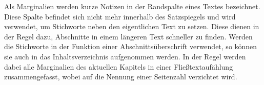 \documentclass[draft]{article}
\begin{document}
  Als Marginalien werden kurze Notizen in der
  Randspalte eines Textes bezeichnet. Diese Spalte
  befindet sich nicht mehr innerhalb
  des Satzspiegels und wird verwendet, um
  Stichworte neben den eigentlichen Text zu setzen.
  Diese dienen in der Regel dazu, Abschnitte in einem
  längeren Text schneller zu finden. Werden die Stichworte
  in der Funktion einer Abschnittsüberschrift verwendet, so können
  sie auch in das Inhaltsverzeichnis aufgenommen werden.
  In der Regel werden dabei alle Margi\-nalien des aktuellen Kapitels
  in einer Fließtextaufählung zusammengefasst, wobei auf die Nennung
  einer Seitenzahl verzichtet wird.
\end{document}
